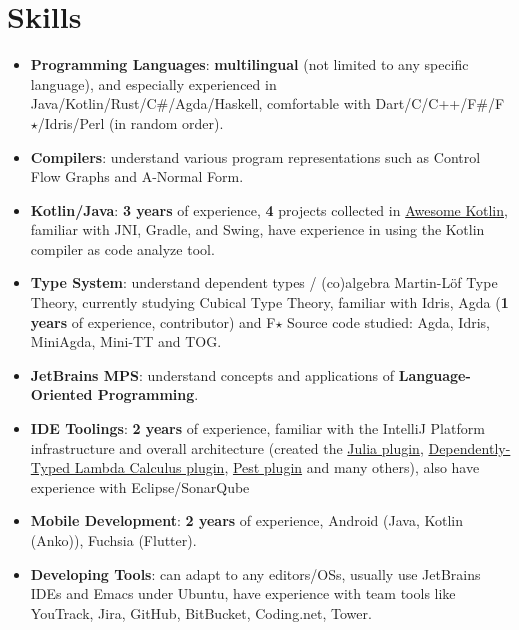 \documentclass{resume}
\begin{document}
\section{Skills}
\begin{itemize}[parsep=0.25ex]
  \item \textbf{Programming Languages}:
    \textbf{multilingual} (not limited to any specific language),
    and especially experienced in Java/Kotlin/Rust/C\#/Agda/Haskell,
    comfortable with Dart/C/C++/F\#/F$\star$/Idris/Perl (in random order).

  \item \textbf{Compilers}:
    understand various program representations such as Control Flow Graphs
    and A-Normal Form.

  \item \textbf{Kotlin/Java}:
    \textbf{3 years} of experience,
    \textbf{4} projects collected in
    \href{https://kotlin.link/?q=ice} {Awesome Kotlin},
    familiar with JNI, Gradle, and Swing, have
    experience in using the Kotlin compiler as code analyze tool.

  \item \textbf{Type System}:
    understand dependent types / (co)algebra Martin-L\"{o}f Type Theory,
    currently studying Cubical Type Theory,
    familiar with Idris, Agda (\textbf{1 years} of experience, contributor) and F$\star$
    \subitem Source code studied: Agda, Idris, MiniAgda, Mini-TT and TOG.

  \item \textbf{JetBrains MPS}:
    understand concepts and applications of \textbf{Language-Oriented Programming}.

  \item \textbf{IDE Toolings}:
    \textbf{2 years} of experience,
    familiar with the IntelliJ Platform infrastructure and overall
    architecture (created the
    \href{https://plugins.jetbrains.com/plugin/10413}
         {Julia plugin},
    \href{https://plugins.jetbrains.com/plugin/12176}
         {Dependently-Typed Lambda Calculus plugin},
    \href{https://plugins.jetbrains.com/plugin/12046}
         {Pest plugin} and many others), also have experience with Eclipse/SonarQube

  \item \textbf{Mobile Development}:
    \textbf{2 years} of experience,
    Android (Java, Kotlin (Anko)), Fuchsia (Flutter).

  \item \textbf{Developing Tools}:
    can adapt to any editors/OSs, usually use JetBrains IDEs and Emacs under Ubuntu,
    have experience with team tools like YouTrack, Jira, GitHub, BitBucket, Coding.net, Tower.
\end{itemize}
\end{document}

